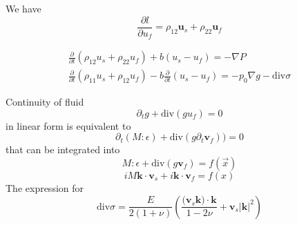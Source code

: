 \documentclass[12pt]{article}
\numberwithin{theorem}{section}
\begin{document}
We have
\[\frac{\partial l}{\partial u_f} = \rho_{12}\mathbf{u}_s +\rho_{22}\mathbf{u}_f\]

\[\begin{array}{l}\frac{\partial}{\partial t} (\rho_{12}u_s + \rho_{22}u_f) + b(u_s-u_f) = -\nabla P \\
\frac{\partial}{\partial t} (\rho_{11}u_s + \rho_{12}u_f) - b\frac{\partial}{\partial t}(u_s-u_f)=-p_0\nabla g - \mathrm{div} \sigma \end{array}\]

Continuity of fluid
\[\partial_t g + \mathrm{div}(gu_f) =0\]
in linear form is equivalent to
\[\partial_t (M:\epsilon) + \mathrm{div} (g \partial_t \mathbf{v}_f))  =0\]
that can be integrated into
\[M:\epsilon + \mathrm{div}(g\mathbf{v}_f) = f(\vec{x})\]
\[iM\mathbf{k}\cdot \mathbf{v}_s + i\mathbf{k}\cdot \mathbf{v}_f = f(x)\]
The expression for
\[\mathrm{div}\sigma =\frac{E}{2(1+\nu)}\left(\frac{(\mathbf{v}_s\mathbf{k)\cdot k}}{1-2\nu}+\mathbf{v}_s|\mathbf{k}|^2\right)\]
\end{document}
